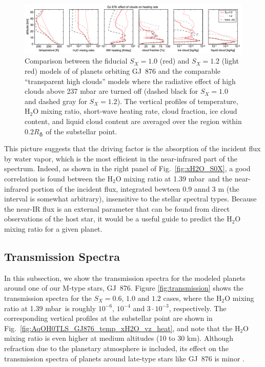 \documentclass[11pt,numberedappendix,twocolappendix,]{emulateapj}
\def\water{H$_2$O }
\def\preslevel{1.39 mbar\ }
\newcommand{\dsa}[1]{{\color{blue}#1}}
\begin{document}
\begin{figure}[htb]
    \begin{center}
    \includegraphics[width=1\hsize]{fig/GJ876_heat_cld.pdf}
    \end{center}
\caption{Comparison between the fiducial \dsa{$S_X=1.0$ (red) and $S_X=1.2$ (light red) models of of planets orbiting GJ~876} and the comparable ``transparent high clouds'' models where the radiative effect of high clouds above 237 mbar are turned off (dashed black for $S_X=1.0$ and dashed gray for $S_X=1.2$). The vertical profiles of temperature, \water mixing ratio, short-wave heating rate, cloud fraction, ice cloud content, and liquid cloud content are averaged \dsa{over the region within $0.2R_\earth$} of the substellar point. }
\label{fig:GJ876_heat_cld}
\end{figure}

This picture suggests that the driving factor is the \dsa{absorption of the incident flux by water vapor}, which is \dsa{the most efficient in the near-infrared part of the spectrum}. 
Indeed, as shown in the right panel of Fig.~\ref{fig:xH2O_S0X}, a good correlation is found between the \water mixing ratio at \preslevel and the near-infrared portion of the incident flux, integrated \dsa{bewteen 0.9 annd 3 \textmu m} (the interval is somewhat arbitrary), insensitive to the stellar spectral types. 
Because the near-IR flux is an external \dsa{parameter} that can be \dsa{found from direct observations} of the host star, it would be a useful guide to predict \dsa{the} \water mixing ratio for a given planet. 


\subsection{Transmission Spectra}
\label{ss:result_TransmissionSpectra}

In this subsection, we \dsa{show} the transmission spectra for the modeled planets around one of our M-type stars, GJ~876. 
Figure \ref{fig:transmission} shows the transmission spectra \dsa{for the} $S_X=0.6$, $1.0$ and $1.2$ \dsa{cases}, where \dsa{the} \water mixing ratio at \preslevel is roughly $10^{-6}$, $10^{-4}$ and $3\cdot 10^{-3}$, \dsa{respectively}. 
The corresponding vertical profiles at the \dsa{substellar point} are shown in Fig.~\ref{fig:AqOH0TLS_GJ876_temp_xH2O_vz_heat}, and note that the \water mixing ratio is even higher at medium altitudes (10 \dsa{to} 30 km).
\dsa{Although refraction} due to the planetary atmosphere is included, \dsa{its effect on the transmission spectra of planets around late-type stars like GJ~876 is minor} \citep{Betremieux2014,Misra2014}. 
\end{document}
